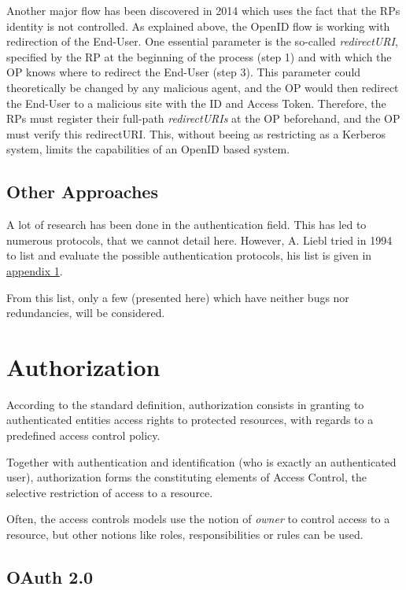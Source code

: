 Another major flow has been discovered in 2014 which uses the fact that the RPs identity is not controlled. As explained above, the OpenID flow is working with redirection of the End-User. One essential parameter is the so-called \textit{redirectURI}, specified by the RP at the beginning of the process (step 1) and with which the OP knows where to redirect the End-User (step 3). This parameter could theoretically be changed by any malicious agent, and the OP would then redirect the End-User to a malicious site with the ID and Access Token. Therefore, the RPs must register their full-path \textit{redirectURIs} at the OP beforehand, and the OP must verify this redirectURI. This, without beeing as restricting as a Kerberos system, limits the capabilities of an OpenID based system.

\subsection{Other Approaches}
A lot of research has been done in the authentication field. This has led to numerous protocols, that we cannot detail here. However,  A. Liebl tried in 1994 to list and evaluate the possible authentication protocols, his list is given in \hyperref[appendix:protocol_list]{appendix 1}. 

From this list, only a few (presented here) which have neither bugs nor redundancies, will be considered.

\section{Authorization}
\label{02_authorization}
According to the standard definition, authorization consists in granting to authenticated entities access rights to protected resources, with regards to a predefined access control policy.

Together with authentication and identification (who is exactly an authenticated user), authorization forms the constituting elements of Access Control, the selective restriction of access to a resource.

Often, the access controls models use the notion of \textit{owner} to control access to a resource, but other notions like roles, responsibilities or rules can be used.
 

\subsection{OAuth 2.0}
\label{02_OAuth}


